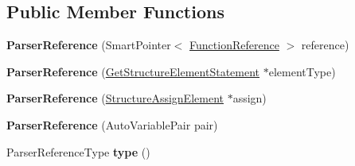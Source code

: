 \subsection*{Public Member Functions}
\begin{DoxyCompactItemize}
\item 
\hypertarget{class_scribble_core_1_1_parser_reference_a40f2688a7edc2d9721af2919b4cb14f0}{{\bfseries Parser\-Reference} (Smart\-Pointer$<$ \hyperlink{class_scribble_core_1_1_function_reference}{Function\-Reference} $>$ reference)}\label{class_scribble_core_1_1_parser_reference_a40f2688a7edc2d9721af2919b4cb14f0}

\item 
\hypertarget{class_scribble_core_1_1_parser_reference_aaafa208d4520c88e59a4fa1771044aef}{{\bfseries Parser\-Reference} (\hyperlink{class_scribble_core_1_1_get_structure_element_statement}{Get\-Structure\-Element\-Statement} $\ast$element\-Type)}\label{class_scribble_core_1_1_parser_reference_aaafa208d4520c88e59a4fa1771044aef}

\item 
\hypertarget{class_scribble_core_1_1_parser_reference_a26eed5b755fdccfd1eb122166b0f0cf4}{{\bfseries Parser\-Reference} (\hyperlink{class_scribble_core_1_1_structure_assign_element}{Structure\-Assign\-Element} $\ast$assign)}\label{class_scribble_core_1_1_parser_reference_a26eed5b755fdccfd1eb122166b0f0cf4}

\item 
\hypertarget{class_scribble_core_1_1_parser_reference_af40b981d02c3d768520fd4e03a9e4dec}{{\bfseries Parser\-Reference} (Auto\-Variable\-Pair pair)}\label{class_scribble_core_1_1_parser_reference_af40b981d02c3d768520fd4e03a9e4dec}

\item 
\hypertarget{class_scribble_core_1_1_parser_reference_a9b4f48269f65478479c6466fbecac0d4}{Parser\-Reference\-Type {\bfseries type} ()}\label{class_scribble_core_1_1_parser_reference_a9b4f48269f65478479c6466fbecac0d4}

\end{DoxyCompactItemize}
